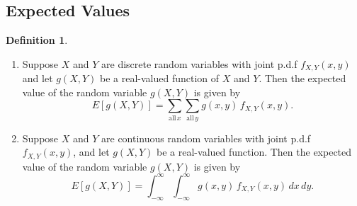 \documentclass[12pt,a4paper]{report}
\theoremstyle{definition}
\newtheorem{definition}[thm]{Definition}
\theoremstyle{plain}
\theoremstyle{definition}
\begin{document}
\subsection{Expected Values }
\begin{definition}
\textbf{ }
\begin{enumerate}
\item Suppose $X$ and $Y$ are discrete random variables with joint p.d.f $f_{X,Y}(x,y)$ and let $g(X,Y)$ be a real-valued function of $X$ and $Y$. Then the expected value of the random variable $g(X,Y)$ is given by \[E[g(X,Y)] = \sum_{\text{all}\, x}\sum_{\text{all}\, y} g(x,y)\, f_{X,Y}(x,y).\]
\item Suppose $X$ and $Y$ are continuous random variables with joint p.d.f $f_{X,Y}(x,y)$, and let $g(X,Y)$ be a real-valued function. Then the expected value of the random variable $g(X,Y)$ is given by \[E[g(X,Y)] = \int^{\infty}_{-\infty}\int^{\infty}_{-\infty}g(x,y)\, f_{X,Y}(x,y)\, dx\,dy.\]
\end{enumerate}
\end{definition}
\end{document}
